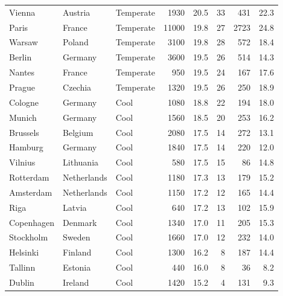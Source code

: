 \begin{table}[ht]
\begin{tabular}{lllrrrrr}
  Vienna & Austria & Temperate & 1930 & 20.5 & 33 & 431 & 22.3 \\ 
  Paris & France & Temperate & 11000 & 19.8 & 27 & 2723 & 24.8 \\ 
  Warsaw & Poland & Temperate & 3100 & 19.8 & 28 & 572 & 18.4 \\ 
  Berlin & Germany & Temperate & 3600 & 19.5 & 26 & 514 & 14.3 \\ 
  Nantes & France & Temperate & 950 & 19.5 & 24 & 167 & 17.6 \\ 
  Prague & Czechia & Temperate & 1320 & 19.5 & 26 & 250 & 18.9 \\ 
  Cologne & Germany & Cool & 1080 & 18.8 & 22 & 194 & 18.0 \\ 
  Munich & Germany & Cool & 1560 & 18.5 & 20 & 253 & 16.2 \\ 
  Brussels & Belgium & Cool & 2080 & 17.5 & 14 & 272 & 13.1 \\ 
  Hamburg & Germany & Cool & 1840 & 17.5 & 14 & 220 & 12.0 \\ 
  Vilnius & Lithuania & Cool & 580 & 17.5 & 15 & 86 & 14.8 \\ 
  Rotterdam & Netherlands & Cool & 1180 & 17.3 & 13 & 179 & 15.2 \\ 
  Amsterdam & Netherlands & Cool & 1150 & 17.2 & 12 & 165 & 14.4 \\ 
  Riga & Latvia & Cool & 640 & 17.2 & 13 & 102 & 15.9 \\ 
  Copenhagen & Denmark & Cool & 1340 & 17.0 & 11 & 205 & 15.3 \\ 
  Stockholm & Sweden & Cool & 1660 & 17.0 & 12 & 232 & 14.0 \\ 
  Helsinki & Finland & Cool & 1300 & 16.2 & 8 & 187 & 14.4 \\ 
  Tallinn & Estonia & Cool & 440 & 16.0 & 8 & 36 & 8.2 \\ 
  Dublin & Ireland & Cool & 1420 & 15.2 & 4 & 131 & 9.3 \\ 
   \bottomrule
\end{tabular}
\end{table}

